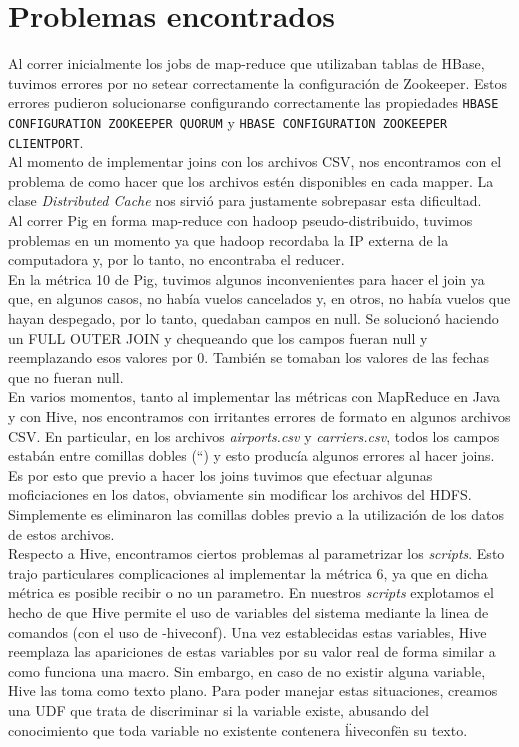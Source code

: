 \documentclass[a4paper,10pt]{article}
\begin{document}
\setcounter{page}{1}

\section{Problemas encontrados}

Al correr inicialmente los jobs de map-reduce que utilizaban tablas de HBase, tuvimos errores por no setear correctamente la configuración de Zookeeper. Estos errores
pudieron solucionarse configurando correctamente las propiedades \texttt{HBASE CONFIGURATION ZOOKEEPER QUORUM} y \texttt{HBASE CONFIGURATION ZOOKEEPER CLIENTPORT}.\\

Al momento de implementar joins con los archivos CSV, nos encontramos con el problema de como hacer que los archivos estén disponibles en cada mapper. La clase
\textit{Distributed Cache} nos sirvió para justamente sobrepasar esta dificultad.\\

Al correr Pig en forma map-reduce con hadoop pseudo-distribuido, tuvimos problemas en un momento ya que hadoop recordaba la IP externa de la computadora y,
por lo tanto, no encontraba el reducer.\\

En la métrica 10 de Pig, tuvimos algunos inconvenientes para hacer el join ya que, en algunos casos, no había vuelos cancelados y, en otros, no había vuelos que hayan despegado, por lo tanto, quedaban campos en null. Se solucionó haciendo un FULL OUTER JOIN y chequeando que los campos fueran null y reemplazando esos valores por 0. También se tomaban los valores de las fechas que no fueran null.\\


En varios momentos, tanto al implementar las métricas con MapReduce en Java y con Hive, nos encontramos con irritantes errores de formato en algunos archivos CSV. En particular,
en los archivos \textit{airports.csv} y \textit{carriers.csv}, todos los campos estabán entre comillas dobles (``) y esto producía algunos errores al hacer joins. Es por esto que
previo a hacer los joins tuvimos que efectuar algunas moficiaciones en los datos, obviamente sin modificar los archivos del HDFS. Simplemente es eliminaron las comillas dobles
previo a la utilización de los datos de estos archivos.\\

Respecto a Hive, encontramos ciertos problemas al parametrizar los \textit{scripts}. Esto trajo particulares complicaciones al implementar la métrica 6, ya que en dicha métrica es posible recibir o no un parametro. En nuestros \textit{scripts} explotamos el hecho de que Hive permite el uso de variables del sistema mediante la linea de comandos (con el uso de -hiveconf). Una vez establecidas estas variables, Hive reemplaza las apariciones de estas variables por su valor real de forma similar a como funciona una macro. Sin embargo, en caso de no existir alguna variable, Hive las toma como texto plano. Para poder manejar estas situaciones, creamos una UDF que trata de discriminar si la variable existe, abusando del conocimiento que toda variable no existente contenera \"hiveconf\" en su texto.
\end{document}
